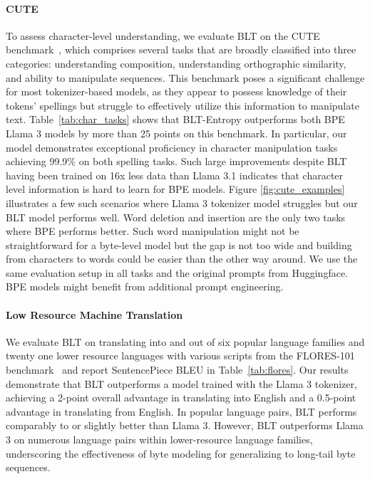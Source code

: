 \paragraph{CUTE}
To assess character-level understanding, we evaluate {\textsc BLT} on the CUTE benchmark~\citep{edman2024cute}, which comprises several tasks that are broadly classified into three categories: understanding composition, understanding orthographic similarity, and ability to manipulate sequences. This benchmark poses a significant challenge for most tokenizer-based models, as they appear to possess knowledge of their tokens' spellings but struggle to effectively utilize this information to manipulate text. Table~\ref{tab:char_tasks} shows that {\textsc BLT}-Entropy outperforms both BPE Llama 3 models by more than 25 points on this benchmark. In particular, our model demonstrates exceptional proficiency in character manipulation tasks achieving 99.9\% on both spelling tasks. Such large improvements despite {\textsc BLT} having been trained on 16x less data than Llama 3.1 indicates that character level information is hard to learn for BPE models. Figure \ref{fig:cute_examples} illustrates a few such scenarios where Llama 3 tokenizer model struggles but our {\textsc BLT} model performs well. Word deletion and insertion are the only two tasks where BPE performs better. Such word manipulation might not be straightforward for a byte-level model but the gap is not too wide and building from characters to words could be easier than the other way around. We use the same evaluation setup in all tasks and the original prompts from Huggingface. BPE models might benefit from additional prompt engineering.

\paragraph{Low Resource Machine Translation} We evaluate {\textsc BLT} on translating into and out of six popular language families and twenty one lower resource languages with various scripts from the FLORES-101 benchmark~\citep{goyal2022flores} and report SentencePiece BLEU in Table~\ref{tab:flores}.
Our results demonstrate that {\textsc BLT} outperforms a model trained with the Llama 3 tokenizer, achieving a 2-point overall advantage in translating into English and a 0.5-point advantage in translating from English. In popular language pairs, {\textsc BLT} performs comparably to or slightly better than Llama 3. However, {\textsc BLT} outperforms Llama 3 on numerous language pairs within lower-resource language families, underscoring the effectiveness of byte modeling for generalizing to long-tail byte sequences.

